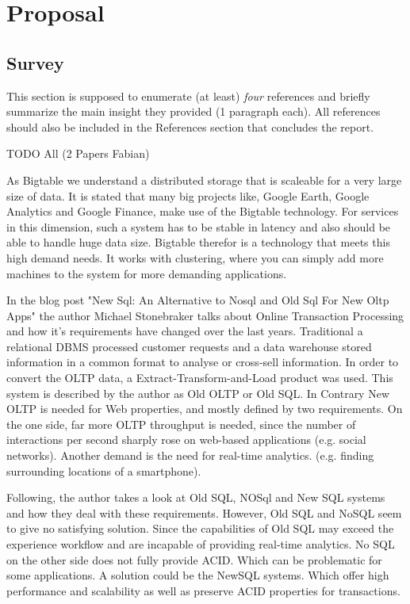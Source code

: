 \section{Proposal}

\subsection{Survey}

This section is supposed to enumerate (at least) \emph{four} references and
briefly summarize the main insight they provided (1 paragraph each). All
references should also be included in the References section that concludes the
report.

TODO All (2 Papers Fabian)

\begin{packed_enum}
   \item
As Bigtable we understand a distributed storage that is scaleable for a very large size of data. It is stated that many big projects like, Google Earth, Google Analytics and Google Finance, make use of the Bigtable technology. For services in this dimension, such a system has to be stable in latency and also should be able to handle huge data size. Bigtable therefor is a technology that meets this high demand needs. It works with clustering, where you can simply add more machines to the system for more demanding applications.  \cite{bigTable}
   \item 
In the blog post "New Sql: An Alternative to Nosql and Old Sql For New Oltp Apps" the author Michael Stonebraker talks about Online
Transaction Processing and how it's requirements have changed over the last years.
Traditional a relational DBMS processed customer requests and a data warehouse stored 
information in a common format to analyse or cross-sell information. In order to convert the OLTP data, a Extract-Transform-and-Load product was used. This system is described by the author as Old OLTP or Old SQL. 
In Contrary New OLTP is needed for Web properties, and mostly defined by two requirements.
On the one side, far more OLTP throughput is needed, since the number of interactions per second
sharply rose on web-based applications (e.g. social networks). Another demand is the need for
real-time analytics. (e.g. finding surrounding locations of a smartphone).

Following, the author takes a look at Old SQL, NOSql and New SQL systems and how they deal with these requirements.
However, Old SQL and NoSQL seem to give no satisfying solution. Since the capabilities of Old
SQL may exceed the experience workflow and are incapable of providing real-time analytics.
No SQL on the other side does not fully provide ACID. Which can be problematic for some applications.
A solution could be the NewSQL systems. Which offer high performance and scalability as well as preserve ACID properties for transactions.


\end{packed_enum}
